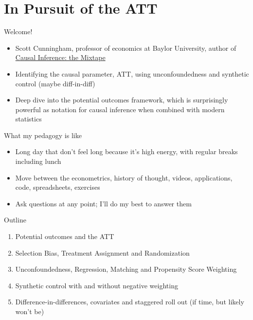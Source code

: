 \documentclass{beamer}
\begin{document}



\section{In Pursuit of the ATT}




\begin{frame}{Welcome!}

  \begin{itemize}
	\item Scott Cunningham, professor of economics at Baylor University, author of \underline{Causal Inference: the Mixtape}
	\item Identifying the causal parameter, ATT, using unconfoundedness and synthetic control (maybe diff-in-diff)
	\item Deep dive into the potential outcomes framework, which is surprisingly powerful as notation for causal inference when combined with modern statistics

  \end{itemize}

\end{frame}



\begin{frame}{What my pedagogy is like}

\begin{itemize}
\item Long day that don't feel long because it's high energy, with regular breaks including lunch
\item Move between the econometrics, history of thought, videos, applications, code, spreadsheets, exercises
\item Ask questions at any point; I'll do my best to answer them
\end{itemize}

\end{frame}



\begin{frame}{Outline}

  \begin{enumerate}
    \item Potential outcomes and the ATT
    \item Selection Bias, Treatment Assignment and Randomization
    \item Unconfoundedness, Regression, Matching and Propensity Score Weighting
    \item Synthetic control with and without negative weighting
    \item Difference-in-differences, covariates and staggered roll out (if time, but likely won't be)
  \end{enumerate}

\end{frame}
\end{document}

